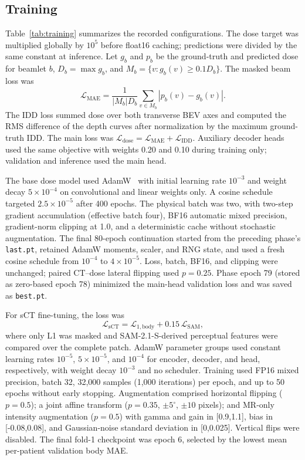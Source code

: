 \documentclass[runningheads]{llncs}
\begin{document}
\subsection{Training}

Table~\ref{tab:training} summarizes the recorded configurations. The dose
target was multiplied globally by $10^5$ before float16 caching; predictions
were divided by the same constant at inference. Let $g_b$ and $p_b$ be the
ground-truth and predicted dose for beamlet $b$, $D_b=\max g_b$, and
$M_b=\{v:g_b(v)\geq0.1D_b\}$. The masked beam loss was
\begin{equation}
 \mathcal{L}_{\mathrm{MAE}}=
 \frac{1}{|M_b|D_b}\sum_{v\in M_b}|p_b(v)-g_b(v)|.
\end{equation}
The IDD loss summed dose over both transverse BEV axes and computed the RMS
difference of the depth curves after normalization by the maximum ground-truth
IDD. The main loss was
$\mathcal{L}_{\mathrm{dose}}=\mathcal{L}_{\mathrm{MAE}}+
\mathcal{L}_{\mathrm{IDD}}$. Auxiliary decoder heads used the same objective with weights 0.20
and 0.10 during training only; validation and inference used the main head.

The base dose model used AdamW~\cite{loshchilov2019adamw} with initial learning rate
$10^{-3}$ and weight decay $5\times10^{-4}$ on convolutional and linear
weights only. A cosine schedule targeted $2.5\times10^{-5}$ after 400 epochs.
The physical batch was two, with two-step gradient accumulation (effective
batch four), BF16 automatic mixed precision, gradient-norm clipping at 1.0,
and a deterministic cache without stochastic augmentation. The final 80-epoch
continuation started from the preceding phase's \texttt{last.pt}, retained
AdamW moments, scaler, and RNG state, and used a fresh cosine schedule from
$10^{-4}$ to $4\times10^{-5}$. Loss, batch, BF16, and clipping were unchanged;
paired CT--dose lateral flipping used $p=0.25$. Phase epoch 79 (stored as
zero-based epoch 78) minimized the main-head validation loss and was saved as
\texttt{best.pt}.

For sCT fine-tuning, the loss was
\begin{equation}
 \mathcal{L}_{\mathrm{sCT}}=\mathcal{L}_{1,\mathrm{body}}+
 0.15\,\mathcal{L}_{\mathrm{SAM}},
\end{equation}
where only L1 was masked and SAM-2.1-S-derived perceptual features
\cite{ravi2024sam2} were compared over the complete patch. AdamW parameter
groups used constant learning rates $10^{-5}$, $5\times10^{-5}$, and
$10^{-4}$ for encoder, decoder, and head, respectively, with weight decay
$10^{-3}$ and no scheduler. Training used FP16 mixed precision, batch 32,
32,000 samples (1,000 iterations) per epoch, and up to 50 epochs without early
stopping. Augmentation comprised horizontal flipping ($p=0.5$); a joint affine
transform ($p=0.35$, $\pm5^\circ$, $\pm10$ pixels); and MR-only intensity
augmentation ($p=0.5$) with gamma and gain in [0.9,1.1], bias in
[-0.08,0.08], and Gaussian-noise standard deviation in [0,0.025]. Vertical
flips were disabled. The final fold-1 checkpoint was epoch 6, selected by the
lowest mean per-patient validation body MAE.
\end{document}

